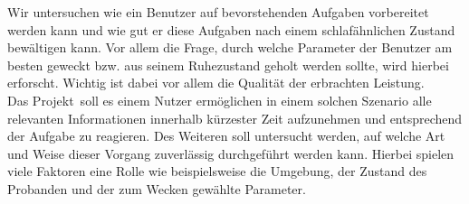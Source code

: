 Wir untersuchen wie ein Benutzer auf bevorstehenden Aufgaben vorbereitet werden kann und wie gut er diese Aufgaben nach einem schlafähnlichen Zustand bewältigen kann. 
Vor allem die Frage, durch welche Parameter der Benutzer am besten geweckt bzw. aus seinem Ruhezustand geholt werden sollte, wird hierbei erforscht. Wichtig ist dabei vor allem die Qualität der erbrachten Leistung.\\
Das Projekt \projectName \,soll es einem Nutzer ermöglichen in einem solchen Szenario alle relevanten Informationen innerhalb kürzester Zeit aufzunehmen und entsprechend der Aufgabe zu reagieren. Des Weiteren soll untersucht werden, auf welche Art und Weise dieser Vorgang zuverlässig durchgeführt werden kann. Hierbei spielen viele Faktoren eine Rolle wie beispielsweise die Umgebung, der Zustand des Probanden und der zum Wecken gewählte Parameter.
